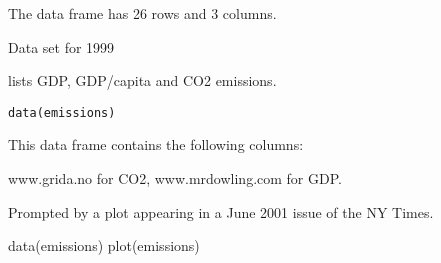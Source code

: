 \begin{Description}\relax
The  data frame has 26 rows and 3 columns.

Data set for 1999

lists GDP, GDP/capita and CO2 emissions.
\end{Description}
\begin{Usage}
\begin{verbatim}data(emissions)\end{verbatim}
\end{Usage}
\begin{Format}\relax
This data frame contains the following columns:
\end{Format}
\begin{Source}\relax
www.grida.no for CO2,
www.mrdowling.com for GDP.

Prompted by a plot appearing in a June 2001 issue of the NY Times.
\end{Source}
\begin{Examples}
\begin{ExampleCode}
data(emissions)
plot(emissions)
\end{ExampleCode}
\end{Examples}

